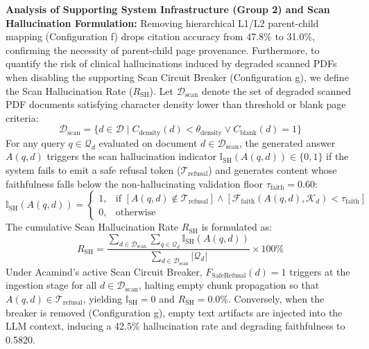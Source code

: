 \documentclass[10pt]{SPIIRAS_Proceedings}
\begin{document}
\textbf{Analysis of Supporting System Infrastructure (Group 2) and Scan Hallucination Formulation:} Removing hierarchical L1/L2 parent-child mapping (Configuration f) drops citation accuracy from 47.8\% to 31.0\%, confirming the necessity of parent-child page provenance. Furthermore, to quantify the risk of clinical hallucinations induced by degraded scanned PDFs when disabling the supporting Scan Circuit Breaker (Configuration g), we define the Scan Hallucination Rate ($R_{\text{SH}}$). Let $\mathcal{D}_{\text{scan}}$ denote the set of degraded scanned PDF documents satisfying character density lower than threshold or blank page criteria:
\begin{equation}
\mathcal{D}_{\text{scan}} = \{ d \in \mathcal{D} \mid C_{\text{density}}(d) < \theta_{\text{density}} \lor C_{\text{blank}}(d) = 1 \}
\label{eq:dscan}
\end{equation}
For any query $q \in \mathcal{Q}_d$ evaluated on document $d \in \mathcal{D}_{\text{scan}}$, the generated answer $A(q, d)$ triggers the scan hallucination indicator $\mathbb{I}_{\text{SH}}(A(q, d)) \in \{0, 1\}$ if the system fails to emit a safe refusal token ($\mathcal{T}_{\text{refusal}}$) and generates content whose faithfulness falls below the non-hallucinating validation floor $\tau_{\text{faith}} = 0.60$:
\begin{equation}
\mathbb{I}_{\text{SH}}(A(q, d)) = 
\begin{cases} 
1, & \text{if } [A(q, d) \notin \mathcal{T}_{\text{refusal}}] \land [\mathcal{F}_{\text{faith}}(A(q, d), \mathcal{K}_d) < \tau_{\text{faith}}] \\
0, & \text{otherwise}
\end{cases}
\label{eq:ish}
\end{equation}
The cumulative Scan Hallucination Rate $R_{\text{SH}}$ is formulated as:
\begin{equation}
R_{\text{SH}} = \frac{\sum_{d \in \mathcal{D}_{\text{scan}}} \sum_{q \in \mathcal{Q}_d} \mathbb{I}_{\text{SH}}(A(q, d))}{\sum_{d \in \mathcal{D}_{\text{scan}}} |\mathcal{Q}_d|} \times 100\%
\label{eq:rsh}
\end{equation}
Under Acamind's active Scan Circuit Breaker, $F_{\text{SafeRefusal}}(d) = 1$ triggers at the ingestion stage for all $d \in \mathcal{D}_{\text{scan}}$, halting empty chunk propagation so that $A(q, d) \in \mathcal{T}_{\text{refusal}}$, yielding $\mathbb{I}_{\text{SH}} = 0$ and $R_{\text{SH}} = 0.0\%$. Conversely, when the breaker is removed (Configuration g), empty text artifacts are injected into the LLM context, inducing a 42.5\% hallucination rate and degrading faithfulness to 0.5820.
\end{document}
